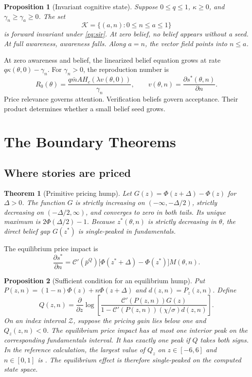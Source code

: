 \documentclass[11pt]{article}
\newtheorem{proposition}{Proposition}
\newtheorem{theorem}{Theorem}
\theoremstyle{definition}
\begin{document}
\begin{proposition}[Invariant cognitive state]\label{prop:invariant}
Suppose $0\leq q\leq1$, $\kappa\geq0$, and $\gamma_n\geq\gamma_a\geq0$. The set
\[
\mathcal K=\{(a,n):0\leq n\leq a\leq1\}
\]
is forward invariant under \eqref{eq:sir}. At zero belief, no belief appears without a seed. At full awareness, awareness falls. Along $a=n$, the vector field points into $n\leq a$.
\end{proposition}

At zero awareness and belief, the linearized belief equation grows at rate $q\kappa(\theta,0)-\gamma_n$. For $\gamma_n>0$, the reproduction number is
\begin{equation}
R_0(\theta)=\frac{q\bar m A H_c\!\left(\lambda v(\theta,0)\right)}{\gamma_n},
\qquad v(\theta,n)=\frac{\partial s^*(\theta,n)}{\partial n}.
\label{eq:r0}
\end{equation}
Price relevance governs attention. Verification beliefs govern acceptance. Their product determines whether a small belief seed grows.

\section{The Boundary Theorems}\label{sec:boundary}

\subsection{Where stories are priced}

\begin{theorem}[Primitive pricing hump]\label{prop:hump}
Let $G(z)=\Phi(z+\Delta)-\Phi(z)$ for $\Delta>0$. The function $G$ is strictly increasing on $(-\infty,-\Delta/2)$, strictly decreasing on $(-\Delta/2,\infty)$, and converges to zero in both tails. Its unique maximum is $2\Phi(\Delta/2)-1$. Because $z^*(\theta,n)$ is strictly decreasing in $\theta$, the direct belief gap $G(z^*)$ is single-peaked in fundamentals.
\end{theorem}

The equilibrium price impact is
\[
\frac{\partial s^*}{\partial n}
=\mathcal C'(\bar p^Q)\big[\Phi(z^*+\Delta)-\Phi(z^*)\big]M(\theta,n).
\]
\begin{proposition}[Sufficient condition for an equilibrium hump]\label{prop:eqhump}
Put $P(z,n)=(1-n)\Phi(z)+n\Phi(z+\Delta)$ and $d(z,n)=P_z(z,n)$. Define
\[
Q(z,n)=\frac{\partial}{\partial z}
\log\left[\frac{\mathcal C'(P(z,n))G(z)}
{1-\mathcal C'(P(z,n))(\chi/\sigma)d(z,n)}\right].
\]
On an index interval $\mathcal Z$, suppose the pricing gain lies below one and $Q_z(z,n)<0$. The equilibrium price impact has at most one interior peak on the corresponding fundamentals interval. It has exactly one peak if $Q$ takes both signs. In the reference calculation, the largest value of $Q_z$ on $z\in[-6,6]$ and $n\in[0,1]$ is \HumpMargin. The equilibrium effect is therefore single-peaked on the computed state space.
\end{proposition}
\end{document}
